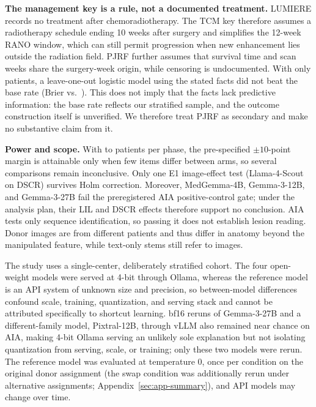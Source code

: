 \documentclass[11pt]{article}
\begin{document}
\textbf{The management key is a rule, not a documented treatment.} LUMIERE records no treatment after chemoradiotherapy. The TCM key therefore assumes a radiotherapy schedule ending 10 weeks after surgery and simplifies the 12-week RANO window, which can still permit progression when new enhancement lies outside the radiation field. PJRF further assumes that survival time and scan weeks share the surgery-week origin, while censoring is undocumented. With only \vfourPjrfN{} patients, a leave-one-out logistic model using the stated facts did not beat the base rate (Brier \vfourPjrfBrierLR{} vs.\ \vfourPjrfBrierBase{}). This does not imply that the facts lack predictive information: the base rate reflects our stratified sample, and the outcome construction itself is unverified. We therefore treat PJRF as secondary and make no substantive claim from it.

\textbf{Power and scope.} With \vfourNLIL{} to \vfourNAIA{} patients per phase, the pre-specified $\pm10$-point margin is attainable only when few items differ between arms, so several comparisons remain inconclusive. Only one E1 image-effect test (Llama-4-Scout on DSCR) survives Holm correction. Moreover, MedGemma-4B, Gemma-3-12B, and Gemma-3-27B fail the preregistered AIA positive-control gate; under the analysis plan, their LIL and DSCR effects therefore support no conclusion. AIA tests only sequence identification, so passing it does not establish lesion reading. Donor images are from different patients and thus differ in anatomy beyond the manipulated feature, while text-only stems still refer to images.

The study uses a single-center, deliberately stratified cohort. The four open-weight models were served at 4-bit through Ollama, whereas the reference model is an API system of unknown size and precision, so between-model differences confound scale, training, quantization, and serving stack and cannot be attributed specifically to shortcut learning. bf16 reruns of Gemma-3-27B and a different-family model, Pixtral-12B, through vLLM also remained near chance on AIA, making 4-bit Ollama serving an unlikely sole explanation but not isolating quantization from serving, scale, or training; only these two models were rerun. The reference model was evaluated at temperature 0, once per condition on the original donor assignment (the swap condition was additionally rerun under alternative assignments; Appendix~\ref{sec:app-summary}), and API models may change over time.
\end{document}
